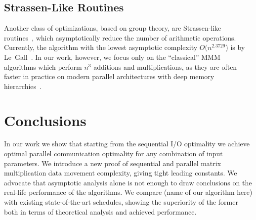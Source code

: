 \documentclass[sigplan,review,anonymous,10pt]{acmart}\settopmatter{printfolios=true,printccs=false,printacmref=false}
\newcommand\greg[1]{\textcolor{blue}{[Greg: #1]}}
\begin{document}
\subsection{Strassen-Like Routines}

Another class of optimizations, based on group theory,
are Strassen-like routines~\cite{Strassen}, which asymptotically reduce the
number of arithmetic operations. Currently, the algorithm with the lowest
asymptotic complexity $O(n^{2.3729}$) is by Le~Gall~\cite{LeGall}. In our work,
however, we focus only on the ``classical'' MMM algorithms which perform $n^3$
additions and multiplications, as they are often faster in practice on modern 
parallel architectures with deep memory hierarchies~\cite{strassenVsClassic}.  



\section{Conclusions}
In our work we show that starting from the sequential I/O optimality we achieve 
optimal parallel communication optimality for any combination of input 
parameters. We introduce a new proof of sequential and parallel matrix 
multiplication data movement complexity, giving tight leading constants. We 
advocate that asymptotic analysis alone is not enough to draw conclusions on 
the real-life performance of the algorithms. We 
compare (name of our algorithm here) with existing state-of-the-art schedules, 
showing the 
superiority of the former both in terms of theoretical analysis and achieved 
performance.

%

%
\end{document}
